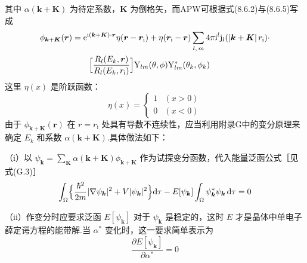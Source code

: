 其中 $\alpha(\boldsymbol{k}+\boldsymbol{K})$ 为待定系数，$\boldsymbol{K}$ 为倒格矢，而APW可根据式(8.6.2)与(8.6.5)写成
\begin{equation}
\begin{aligned}
  \phi_{\boldsymbol{k}+\boldsymbol{K}}(\boldsymbol{r})
  &=\mathrm{e}^{\mathrm{i}(\boldsymbol{k}+\boldsymbol{K})\cdot\boldsymbol{r}}\eta(\boldsymbol{r}-\boldsymbol{r}_{\mathrm{i}})
  +\eta(\boldsymbol{r}_{\mathrm{i}}-\boldsymbol{r})\sum_{l,\,m}4\pi\mathrm{i}^{l}\mathrm{j}_{l}(|\boldsymbol{k}+\boldsymbol{K}|\,r_{\mathrm{i}})\cdot\\
  &\qquad\Bigl[\frac{R_{l}(E_{k},\boldsymbol{r})}{R_{l}(E_{k},r_{\mathrm{i}})}\Bigr]\mathrm{Y}_{lm}(\theta,\phi)\mathrm{Y}_{lm}^{*}(\theta_{k},\phi_{k})
\end{aligned}
\end{equation}
这里 $\eta(x)$ 是阶跃函数：
\begin{equation}
  \eta(x)=\begin{cases}
    1 & (x>0)\\
    0 & (x<0)
  \end{cases}
\end{equation}
由于 $\phi_{\boldsymbol{k}+\boldsymbol{K}}(\boldsymbol{r})$ 在 $r=r_{\mathrm{i}}$ 处具有导数不连续性，应当利用附录G中的变分原理来确定 $E_{k}$ 和系数 $\alpha(\boldsymbol{k}+\boldsymbol{K})$.具体做法如下：

（i）以 $\psi_{\boldsymbol{k}}=\sum_{\boldsymbol{K}}\alpha(\boldsymbol{k}+\boldsymbol{K})\phi_{\boldsymbol{k}+\boldsymbol{K}}$ 作为试探变分函数，代入能量泛函公式［见式(G.3)］
\begin{equation}
  \int_{\Omega}\Bigl\{\frac{\hbar^{2}}{2m}|\nabla\psi_{\boldsymbol{k}}|^{2}+V|\psi_{\boldsymbol{k}}|^{2}\Bigr\}\mathrm{d}\tau
  -E[\psi_{\boldsymbol{k}}]\int_{\Omega}\psi_{\boldsymbol{k}}^{*}\psi_{\boldsymbol{k}}\,\mathrm{d}\tau=0
\end{equation}

（ii）作变分时应要求泛函 $E[\psi_{\boldsymbol{k}}]$ 对于 $\psi_{\boldsymbol{k}}$ 是稳定的，这时 $E$ 才是晶体中单电子薛定谔方程的能带解.当 $\alpha^{*}$ 变化时，这一要求简单表示为
\begin{equation}
  \frac{\partial E[\psi_{\boldsymbol{k}}]}{\partial\alpha^{*}}=0
\end{equation}

